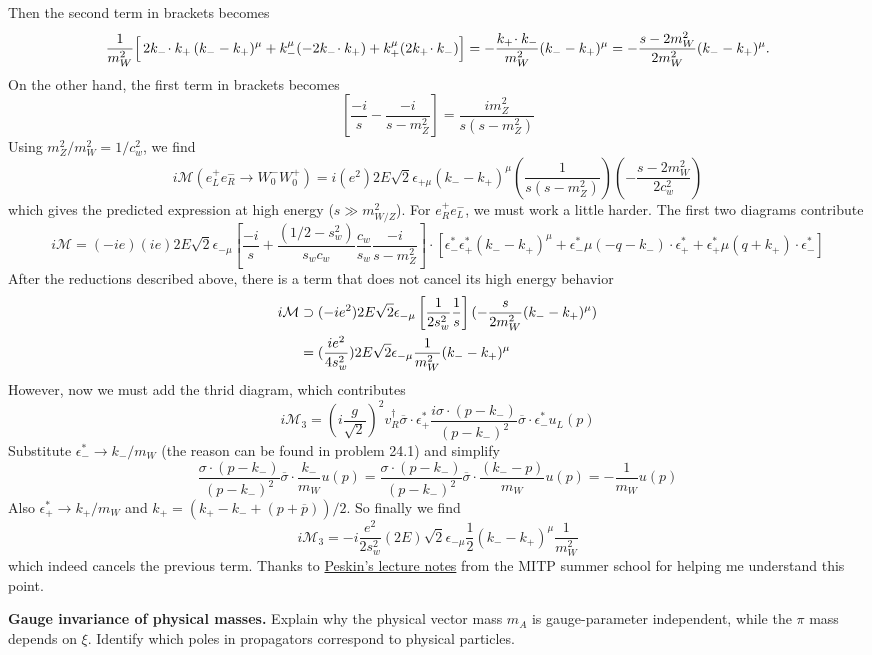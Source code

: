 \begin{solution}[23.5]
$$	$$
	Then the second term in brackets becomes
	$$
		\frac{1}{m_W^2}\Bigl[\,2k_-\!\cdot k_+\,(k_- - k_+)^\mu + k_-^\mu(-2k_-\!\cdot k_+) + k_+^\mu(2k_+\!\cdot k_-)\Bigr]
		= -\frac{k_+\!\cdot k_-}{m_W^2}(k_- - k_+)^\mu 
		= -\frac{s-2m_W^2}{2m_W^2}(k_- - k_+)^\mu .
	$$
	On the other hand, the first term in brackets becomes
	\[
\left[\frac{-i}{s}-\frac{-i}{s-m_Z^2}\right]=\frac{im_Z^2}{s(s-m_Z^2)}
	\]
	Using $m_Z^2/m_W^2=1/c_w^2$, we find
	\[
	i\mathcal{M}(e^{+}_Le^{-}_R\to W_{0}^{-}W_{0}^{+})=i(e^2)2E\sqrt{2}\epsilon_{+\mu}(k_--k_+)^\mu\left(\frac{1}{s(s-m_Z^2)}\right)\left(-\frac{s-2m_W^2}{2c_w^2}\right)
	\]
	which gives the predicted expression at high energy ($s\gg m^2_{W/Z}$). For $e^+_{R}e^{-}_L$, we must work a little harder.   The first two diagrams contribute 
	\[
	i\mathcal{M}=(-ie)(ie)2E\sqrt{2}\epsilon_{-\mu}\left[\frac{-i}{s}+\frac{(1/2-s_w^2)}{s_wc_w}\frac{c_w}{s_w}\frac{-i}{s-m_Z^2}\right]\cdot\left[\epsilon_-^*\epsilon_+^*(k_--k_+)^\mu+\epsilon_-^*\mu(-q-k_-)\cdot\epsilon_+^*+\epsilon_+^*\mu(q+k_+)\cdot\epsilon_-^*\right]
	\] 
	After the reductions described above, there is a term that does not cancel its high energy behavior
	\[
	\begin{aligned}i\mathcal{M}&\supset(-ie^2)2E\sqrt{2}\epsilon_{\large-\mu}\left[\frac{1}{2s_w^2}\frac{1}{s}\right](-\frac{s}{2m_W^2}(k_{\large-}-k_{\large+})^{\mu})\\&=(\frac{ie^2}{4s_w^2})2E\sqrt{2}\epsilon_{-\mu}\frac{1}{m_W^2}(k_--k_+)^\mu\end{aligned}
	\]
	However, now we must add the thrid diagram, which contributes 
	\[
	i\mathcal{M}_3=(i\frac{g}{\sqrt{2}})^2v_R^\dagger\overline{\sigma}\cdot\epsilon_+^*\frac{i\sigma\cdot(p-k_-)}{(p-k_-)^2}\overline{\sigma}\cdot\epsilon_-^*u_L(p)
	\]
	Substitute $\epsilon_-^*\to k_-/m_W$ (the reason can be found in problem 24.1) and simplify
	\[
	\frac{\sigma\cdot(p-k_-)}{(p-k_-)^2}\overline{\sigma}\cdot\frac{k_-}{m_W}u(p)=\frac{\sigma\cdot(p-k_-)}{(p-k_-)^2}\overline{\sigma}\cdot\frac{(k_--p)}{m_W}u(p)=-\frac{1}{m_W}u(p)
	\]
	Also $\epsilon_+^*\to k_+/m_W$ and $k_+=(k_+-k_-+(p+\overline{p}))/2$. So finally we find
	\[
	i\mathcal{M}_3=-i\frac{e^2}{2s_w^2}(2E)\sqrt{2}\epsilon_{-\mu}\frac{1}{2}(k_{-}-k_{+})^{\mu}\frac{1}{m_W^2}
	\]
	which indeed cancels the previous term. Thanks to \href{https://indico.mitp.uni-mainz.de/event/159/sessions/168/}{Peskin's lecture notes} from the MITP summer school for helping me understand this point.
\end{solution}
\begin{problem}
    \textbf{Gauge invariance of physical masses.} Explain why the physical vector mass \(m_A\) is gauge-parameter independent, while the \(\pi\) mass depends on \(\xi\). Identify which poles in propagators correspond to physical particles.
\end{problem}
